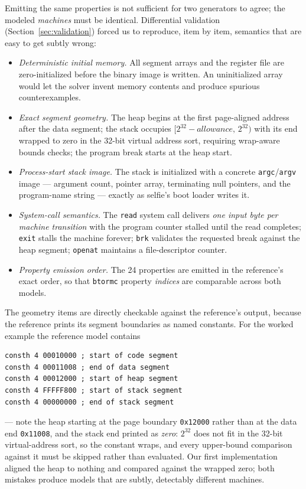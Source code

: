 \documentclass[sigplan,screen,nonacm]{acmart}
\begin{document}
Emitting the same properties is not sufficient for two generators to
agree; the modeled \emph{machines} must be identical. Differential
validation (Section~\ref{sec:validation}) forced us to reproduce, item
by item, semantics that are easy to get subtly wrong:

\begin{itemize}
  \item \emph{Deterministic initial memory.} All segment arrays and the
        register file are zero-initialized before the binary image is
        written. An uninitialized array would let the solver invent
        memory contents and produce spurious counterexamples.
  \item \emph{Exact segment geometry.} The heap begins at the first
        page-aligned address after the data segment; the stack occupies
        $[2^{32}{-}\textit{allowance},\,2^{32})$ with its end wrapped to
        zero in the 32-bit virtual address sort, requiring wrap-aware
        bounds checks; the program break starts at the heap start.
  \item \emph{Process-start stack image.} The stack is initialized with
        a concrete \texttt{argc}/\texttt{argv} image --- argument count,
        pointer array, terminating null pointers, and the program-name
        string --- exactly as selfie's boot loader writes it.
  \item \emph{System-call semantics.} The \texttt{read} system call
        delivers \emph{one input byte per machine transition} with the
        program counter stalled until the read completes; \texttt{exit}
        stalls the machine forever; \texttt{brk} validates the requested
        break against the heap segment; \texttt{openat} maintains a
        file-descriptor counter.
  \item \emph{Property emission order.} The 24 properties are emitted in
        the reference's exact order, so that \texttt{btormc} property
        \emph{indices} are comparable across both models.
\end{itemize}

The geometry items are directly checkable against the reference's
output, because the reference prints its segment boundaries as named
constants. For the worked example the reference model contains
\begin{lstlisting}
consth 4 00010000 ; start of code segment
consth 4 00011008 ; end of data segment
consth 4 00012000 ; start of heap segment
consth 4 FFFFF800 ; start of stack segment
consth 4 00000000 ; end of stack segment
\end{lstlisting}
\noindent --- note the heap starting at the page boundary
\texttt{0x12000} rather than at the data end \texttt{0x11008}, and the
stack end printed as \emph{zero}: $2^{32}$ does not fit in the 32-bit
virtual-address sort, so the constant wraps, and every upper-bound
comparison against it must be skipped rather than evaluated. Our first
implementation aligned the heap to nothing and compared against the
wrapped zero; both mistakes produce models that are subtly, detectably
different machines.
\end{document}
